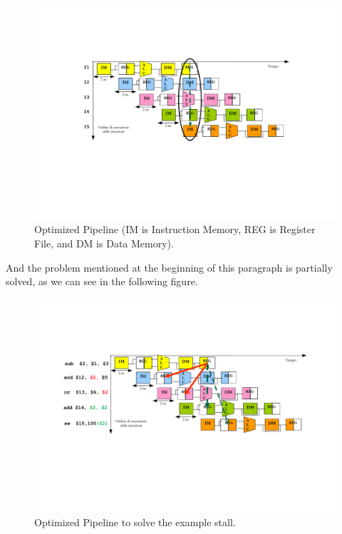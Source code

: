 \documentclass[a4paper]{article}
\begin{document}
    \begin{figure}[!htp]
        \centering
        \includegraphics[width=\textwidth]{img/optimized-pipeline-1.pdf}
        \caption{Optimized Pipeline (IM is Instruction Memory, REG is Register File, and DM is Data Memory).\cite{pipelining-slides}}
        \label{fig: Optimized Pipeline}
    \end{figure}

    \noindent
    And the problem mentioned at the beginning of this paragraph is partially solved, as we can see in the following figure.
    \begin{figure}[!htp]
        \centering
        \includegraphics[width=\textwidth]{img/optimized-pipeline-2.pdf}
        \caption{Optimized Pipeline to solve the example stall.\cite{pipelining-slides}}
    \end{figure}
\end{document}
